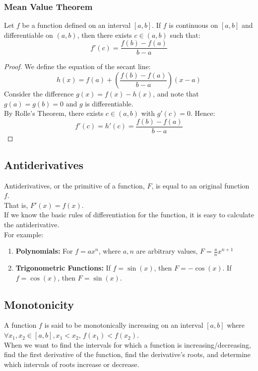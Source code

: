 \documentclass{article}
\begin{document}
\subsubsection{Mean Value Theorem}
Let $f$ be a function defined on an interval $[a,b]$. If $f$ is continuous on $[a,b]$ and differentiable on $(a,b)$, then there exists $c \in (a,b)$ such that:
$$f'(c) = \frac{f(b) - f(a)}{b - a}$$
\begin{proof}
We define the equation of the secant line:
$$h(x) = f(a) + \left( \frac{f(b) - f(a)}{b - a} \right) (x - a)$$
Consider the difference $g(x) = f(x) - h(x)$, and note that $g(a) = g(b) = 0$ and $g$ is differentiable.\\
By Rolle's Theorem, there exists $c \in (a,b)$ with $g'(c) = 0$. Hence:
$$f'(c) = h'(c) = \frac{f(b) - f(a)}{b - a}$$
\end{proof}

\subsection{Antiderivatives}
Antiderivatives, or the primitive of a function, $F$, is equal to an original function $f$.\\
That is, $F'(x) = f(x)$.\\
If we know the basic rules of differentiation for the function, it is easy to calculate the antiderivative.\\
For example:
\begin{enumerate}
    \item \textbf{Polynomials: }For $f = ax^n$, where $a,n$ are arbitrary values, $F = \frac{a}{n} x^{n + 1}$
    \item \textbf{Trigonometric Functions: } If $f = \sin(x)$, then $F = -\cos(x)$. If $f = \cos(x)$, then $F = \sin(x)$.
\end{enumerate}
\subsection{Monotonicity}
A function $f$ is said to be monotonically increasing on an interval $[a,b]$ where $\forall x_1, x_2 \in [a,b], x_1 < x_2$, $f(x_1) < f(x_2)$.\\
When we want to find the intervals for which a function is increasing/decreasing, find the first derivative of the function, find the derivative's roots, and determine which intervals of roots increase or decrease.
\end{document}
